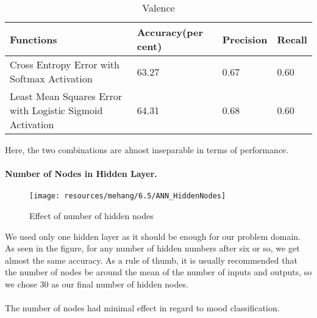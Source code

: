 \begin{table}[h!]
        \caption{Valence}
        \begin{center}
                \begin{tabular}{|l|l|l|l|}
                        \hline

                        Functions
                        &
                        Accuracy(per cent)
                        &
                        Precision
                        &
                        Recall
                        \\\hline

                        Cross Entropy Error with Softmax Activation
                        &
                        63.27
                        &
                        0.67
                        &
                        0.60
                        \\\hline
                        
                        Least Mean Squares Error with Logistic Sigmoid Activation 
                        &
                        64.31
                        &
                        0.68
                        &
                        0.60
                        \\\hline

                 \end{tabular}
        \end{center}
\end{table}

Here, the two combinations are almost inseparable in terms of performance. 

\paragraph{Number of Nodes in Hidden Layer.}

\begin{figure}[h!]
        \centering
        \texttt{[image: resources/mehang/6.5/ANN\_HiddenNodes]}
        \caption{Effect of number of hidden nodes}
\end{figure}

We used only one hidden layer as it should be enough for our problem domain. 
As seen in the figure, for any number of hidden numbers after six or so, we get almost the same accuracy. As a rule of thumb, it is usually recommended that the number of nodes be around the mean of the number of inputs and outputs, so we chose 30 as our final number of hidden nodes.\\
\\
The number of nodes had minimal effect in regard to mood classification. 

